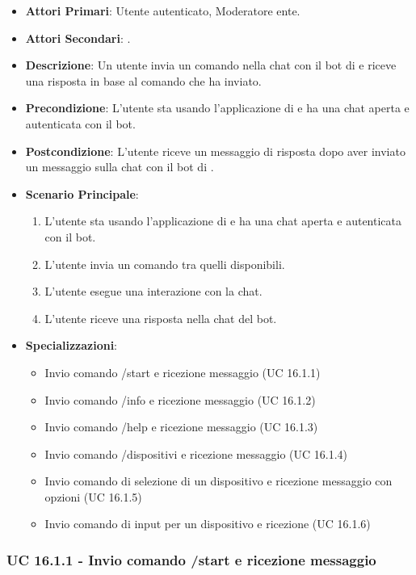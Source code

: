 	\begin{itemize}
		\item \textbf{Attori Primari}: Utente autenticato, Moderatore ente.
		\item \textbf{Attori Secondari}: .
		\item \textbf{Descrizione}: Un utente invia un comando nella chat con il bot di  e riceve una risposta in base al comando che ha inviato. 
		\item \textbf{Precondizione}: L'utente sta usando l'applicazione di  e ha una chat aperta e autenticata con il bot.
		\item \textbf{Postcondizione}: L'utente riceve un messaggio di risposta dopo aver inviato un messaggio sulla chat con il bot di .
		\item \textbf{Scenario Principale}:
		\begin{enumerate}
			\item L'utente sta usando l'applicazione di  e ha una chat aperta e autenticata con il bot. 
			\item L'utente invia un comando tra quelli disponibili.
			\item L'utente esegue una interazione con la chat.
			\item L'utente riceve una risposta nella chat del bot.
		\end{enumerate}
		\item \textbf{Specializzazioni}:
		\begin{itemize}
			\item Invio comando /start e ricezione messaggio (UC 16.1.1)
			\item Invio comando /info e ricezione messaggio (UC 16.1.2)
			\item Invio comando /help e ricezione messaggio (UC 16.1.3)
			\item Invio comando /dispositivi e ricezione messaggio (UC 16.1.4)
			\item Invio comando di selezione di un dispositivo e ricezione messaggio con opzioni (UC 16.1.5)
			\item Invio comando di input per un dispositivo e ricezione (UC 16.1.6)
		\end{itemize}
	\end{itemize}

	\subsubsection{UC 16.1.1 - Invio comando /start e ricezione messaggio}

